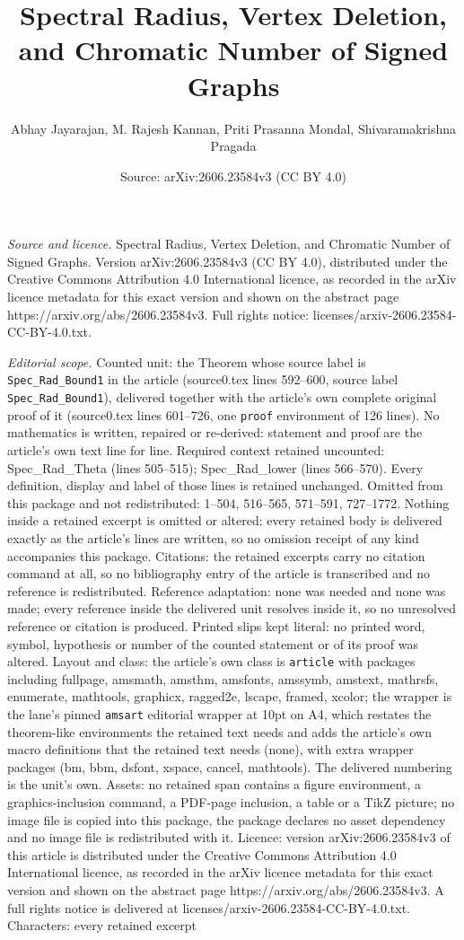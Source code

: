 \documentclass[10pt,a4paper]{amsart}
\title[Spectral Radius, Vertex Deletion, and Chromatic Number of Si]{Spectral Radius, Vertex Deletion, and Chromatic Number of Signed Graphs}
\author{Abhay Jayarajan, M. Rajesh Kannan, Priti Prasanna Mondal, Shivaramakrishna Pragada}
\date{Source: arXiv:2606.23584v3 (CC BY 4.0)}
\begin{document}
\maketitle

\noindent\emph{Source and licence.} Spectral Radius, Vertex Deletion, and Chromatic Number of Signed Graphs. Version arXiv:2606.23584v3 (CC BY 4.0), distributed under the Creative Commons Attribution 4.0 International licence, as recorded in the arXiv licence metadata for this exact version and shown on the abstract page https://arxiv.org/abs/2606.23584v3. Full rights notice: licenses/arxiv-2606.23584-CC-BY-4.0.txt.\par\smallskip

\noindent\textit{Editorial scope.} Counted unit: the Theorem whose source label is \texttt{Spec\_Rad\_Bound1} in the article (source0.tex lines 592--600, source label \texttt{Spec\_Rad\_Bound1}), delivered together with the article's own complete original proof of it (source0.tex lines 601--726, one \texttt{proof} environment of 126 lines). No mathematics is written, repaired or re-derived: statement and proof are the article's own text line for line. Required context retained uncounted: Spec\_Rad\_Theta (lines 505--515); Spec\_Rad\_lower (lines 566--570). Every definition, display and label of those lines is retained unchanged. Omitted from this package and not redistributed: 1--504, 516--565, 571--591, 727--1772. Nothing inside a retained excerpt is omitted or altered: every retained body is delivered exactly as the article's lines are written, so no omission receipt of any kind accompanies this package. Citations: the retained excerpts carry no citation command at all, so no bibliography entry of the article is transcribed and no reference is redistributed. Reference adaptation: none was needed and none was made; every reference inside the delivered unit resolves inside it, so no unresolved reference or citation is produced. Printed slips kept literal: no printed word, symbol, hypothesis or number of the counted statement or of its proof was altered. Layout and class: the article's own class is \texttt{article} with packages including fullpage, amsmath, amsthm, amsfonts, amssymb, amstext, mathrsfs, enumerate, mathtools, graphicx, ragged2e, lscape, framed, xcolor; the wrapper is the lane's pinned \texttt{amsart} editorial wrapper at 10pt on A4, which restates the theorem-like environments the retained text needs and adds the article's own macro definitions that the retained text needs (none), with extra wrapper packages (bm, bbm, dsfont, xspace, cancel, mathtools). The delivered numbering is the unit's own. Assets: no retained span contains a figure environment, a graphics-inclusion command, a PDF-page inclusion, a table or a TikZ picture; no image file is copied into this package, the package declares no asset dependency and no image file is redistributed with it. Licence: version arXiv:2606.23584v3 of this article is distributed under the Creative Commons Attribution 4.0 International licence, as recorded in the arXiv licence metadata for this exact version and shown on the abstract page https://arxiv.org/abs/2606.23584v3. A full rights notice is delivered at licenses/arxiv-2606.23584-CC-BY-4.0.txt. Characters: every retained excerpt 
\end{document}
